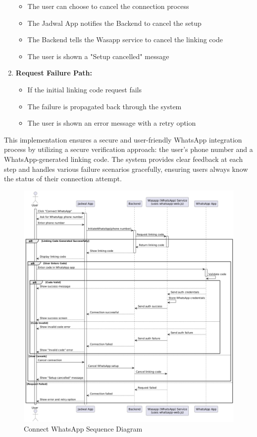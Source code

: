 \begin{enumerate}
        \begin{itemize}
          \item The user can choose to cancel the connection process
          \item The Jadwal App notifies the Backend to cancel the setup
          \item The Backend tells the Wasapp service to cancel the linking code
          \item The user is shown a "Setup cancelled" message
        \end{itemize}
  \item \textbf{Request Failure Path:}
        \begin{itemize}
          \item If the initial linking code request fails
          \item The failure is propagated back through the system
          \item The user is shown an error message with a retry option
        \end{itemize}
\end{enumerate}

This implementation ensures a secure and user-friendly WhatsApp integration process by utilizing a secure verification approach: the user's phone number and a WhatsApp-generated linking code. The system provides clear feedback at each step and handles various failure scenarios gracefully, ensuring users always know the status of their connection attempt.

\begin{figure}[!h]
  \centering
  \includegraphics[width=\textwidth]{images/docs/diagrams/sequence-diagrams/all-sequence-diagrams/Connect WhatsApp.png}
  \caption{Connect WhatsApp Sequence Diagram}
  \label{fig:seq/connect-whatsapp}
\end{figure}
